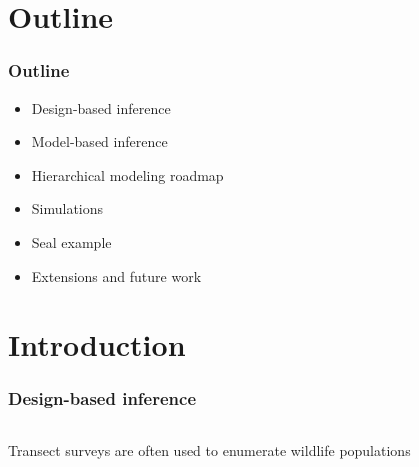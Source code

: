 \documentclass[serif,mathserif]{beamer}
\begin{document}

 \section{Outline}  %

\begin{frame}
  \frametitle{Outline}
  \begin{itemize}
  \item Design-based inference \pause
  \item Model-based inference \pause
  \item Hierarchical modeling roadmap \pause
  \item Simulations \pause
  \item Seal example \pause %
  \item Extensions and future work
  \end{itemize}
\end{frame}

\section{Introduction} %

\begin{frame}
\frametitle{Design-based inference}
\begin{columns}[c]
\column{1.5in}
Transect surveys are often used to enumerate wildlife populations
\column{2in}
\end{columns}
\end{frame}
\end{document}
